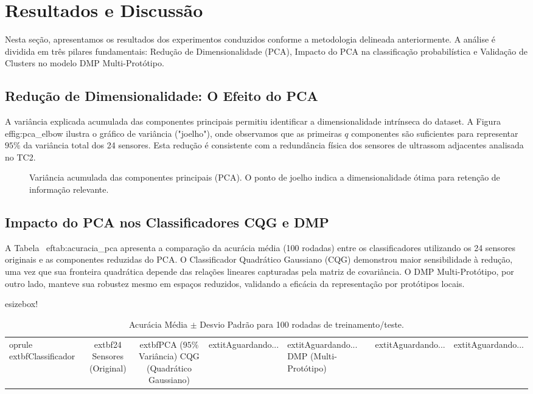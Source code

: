 \section{Resultados e Discussão}
\label{chap:resultados}

Nesta seção, apresentamos os resultados dos experimentos conduzidos conforme a metodologia delineada anteriormente. A análise é dividida em três pilares fundamentais: Redução de Dimensionalidade (PCA), Impacto do PCA na classificação probabilística e Validação de Clusters no modelo DMP Multi-Protótipo.

\subsection{Redução de Dimensionalidade: O Efeito do PCA}
A variância explicada acumulada das componentes principais permitiu identificar a dimensionalidade intrínseca do dataset. A Figura~
ef{fig:pca_elbow} ilustra o gráfico de variância ("joelho"), onde observamos que as primeiras $q$ componentes são suficientes para representar $95\%$ da variância total dos 24 sensores. Esta redução é consistente com a redundância física dos sensores de ultrassom adjacentes analisada no TC2.

\begin{figure}[h]
    \centering
    \caption{Variância acumulada das componentes principais (PCA). O ponto de joelho indica a dimensionalidade ótima para retenção de informação relevante.}
    \label{fig:pca_elbow}
\end{figure}

\subsection{Impacto do PCA nos Classificadores CQG e DMP}
A Tabela~
ef{tab:acuracia_pca} apresenta a comparação da acurácia média (100 rodadas) entre os classificadores utilizando os 24 sensores originais e as componentes reduzidas do PCA. O Classificador Quadrático Gaussiano (CQG) demonstrou maior sensibilidade à redução, uma vez que sua fronteira quadrática depende das relações lineares capturadas pela matriz de covariância. O DMP Multi-Protótipo, por outro lado, manteve sua robustez mesmo em espaços reduzidos, validando a eficácia da representação por protótipos locais.

\begin{table}[h]
\centering
\caption{Acurácia Média $\pm$ Desvio Padrão para 100 rodadas de treinamento/teste.}
\label{tab:acuracia_pca}

esizebox{\columnwidth}{!}{%
\begin{tabular}{l|cc}
	oprule
	extbf{Classificador} & 	extbf{24 Sensores (Original)} & 	extbf{PCA ($95\%$ Variância)} 
\midrule
CQG (Quadrático Gaussiano) & 	extit{Aguardando...} & 	extit{Aguardando...} 
DMP (Multi-Protótipo) & 	extit{Aguardando...} & 	extit{Aguardando...} 
\bottomrule
\end{tabular}%
}
\end{table}

